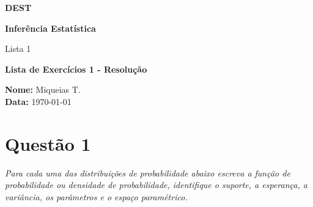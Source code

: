 \documentclass[12pt, a4paper]{article}
\begin{document}
\begin{titlepage}
    \centering


    {\Huge \textbf{DEST}}\par

    \vspace{2cm}

    {\Large \textbf{Inferência Estatística}} \par
    {\Large Lista 1 } \par

    \vspace{2.5cm}

    {\Large \textbf{Lista de Exercícios 1 - Resolução}}

    \vfill %

    \large
    \begin{flushleft}
    \textbf{Nome:} Miqueias T. \\
    \textbf{Data:} \today
    \end{flushleft}
\end{titlepage}


\section*{Questão 1}
\textit{Para cada uma das distribuições de probabilidade abaixo escreva a função de probabilidade ou densidade de probabilidade, identifique o suporte, a esperança, a variância, os parâmetros e o espaço paramétrico.}
\end{document}
